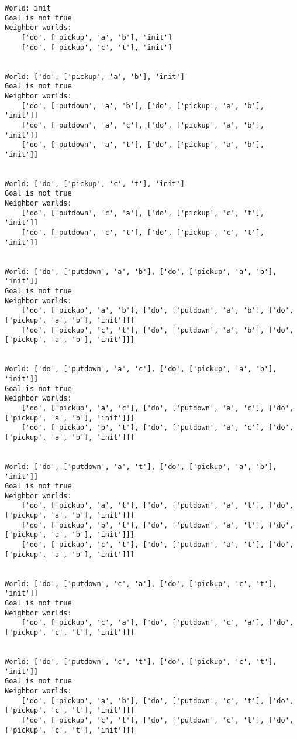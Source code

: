 \documentclass[11pt]{article}
\begin{document}
    \begin{Verbatim}[commandchars=\\\{\}]
World: init
Goal is not true
Neighbor worlds:
    ['do', ['pickup', 'a', 'b'], 'init']
    ['do', ['pickup', 'c', 't'], 'init']


World: ['do', ['pickup', 'a', 'b'], 'init']
Goal is not true
Neighbor worlds:
    ['do', ['putdown', 'a', 'b'], ['do', ['pickup', 'a', 'b'], 'init']]
    ['do', ['putdown', 'a', 'c'], ['do', ['pickup', 'a', 'b'], 'init']]
    ['do', ['putdown', 'a', 't'], ['do', ['pickup', 'a', 'b'], 'init']]


World: ['do', ['pickup', 'c', 't'], 'init']
Goal is not true
Neighbor worlds:
    ['do', ['putdown', 'c', 'a'], ['do', ['pickup', 'c', 't'], 'init']]
    ['do', ['putdown', 'c', 't'], ['do', ['pickup', 'c', 't'], 'init']]


World: ['do', ['putdown', 'a', 'b'], ['do', ['pickup', 'a', 'b'], 'init']]
Goal is not true
Neighbor worlds:
    ['do', ['pickup', 'a', 'b'], ['do', ['putdown', 'a', 'b'], ['do', ['pickup', 'a', 'b'], 'init']]]
    ['do', ['pickup', 'c', 't'], ['do', ['putdown', 'a', 'b'], ['do', ['pickup', 'a', 'b'], 'init']]]


World: ['do', ['putdown', 'a', 'c'], ['do', ['pickup', 'a', 'b'], 'init']]
Goal is not true
Neighbor worlds:
    ['do', ['pickup', 'a', 'c'], ['do', ['putdown', 'a', 'c'], ['do', ['pickup', 'a', 'b'], 'init']]]
    ['do', ['pickup', 'b', 't'], ['do', ['putdown', 'a', 'c'], ['do', ['pickup', 'a', 'b'], 'init']]]


World: ['do', ['putdown', 'a', 't'], ['do', ['pickup', 'a', 'b'], 'init']]
Goal is not true
Neighbor worlds:
    ['do', ['pickup', 'a', 't'], ['do', ['putdown', 'a', 't'], ['do', ['pickup', 'a', 'b'], 'init']]]
    ['do', ['pickup', 'b', 't'], ['do', ['putdown', 'a', 't'], ['do', ['pickup', 'a', 'b'], 'init']]]
    ['do', ['pickup', 'c', 't'], ['do', ['putdown', 'a', 't'], ['do', ['pickup', 'a', 'b'], 'init']]]


World: ['do', ['putdown', 'c', 'a'], ['do', ['pickup', 'c', 't'], 'init']]
Goal is not true
Neighbor worlds:
    ['do', ['pickup', 'c', 'a'], ['do', ['putdown', 'c', 'a'], ['do', ['pickup', 'c', 't'], 'init']]]


World: ['do', ['putdown', 'c', 't'], ['do', ['pickup', 'c', 't'], 'init']]
Goal is not true
Neighbor worlds:
    ['do', ['pickup', 'a', 'b'], ['do', ['putdown', 'c', 't'], ['do', ['pickup', 'c', 't'], 'init']]]
    ['do', ['pickup', 'c', 't'], ['do', ['putdown', 'c', 't'], ['do', ['pickup', 'c', 't'], 'init']]]



\end{Verbatim}
\end{document}
